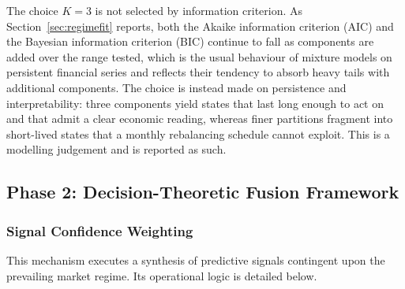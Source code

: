 The choice $K = 3$ is not selected by information criterion. As
Section~\ref{sec:regimefit} reports, both the Akaike information criterion (AIC) and the
Bayesian information criterion (BIC) continue to fall as components are added over the
range tested, which is the usual behaviour of mixture models on persistent financial
series and reflects their tendency to absorb heavy tails with additional components. The
choice is instead made on persistence and interpretability: three components yield states
that last long enough to act on and that admit a clear economic reading, whereas finer
partitions fragment into short-lived states that a monthly rebalancing schedule cannot
exploit. This is a modelling judgement and is reported as such.

\subsection{Phase 2: Decision-Theoretic Fusion Framework}

\subsubsection{Signal Confidence Weighting}

This mechanism executes a synthesis of predictive signals contingent upon the prevailing
market regime. Its operational logic is detailed below.

